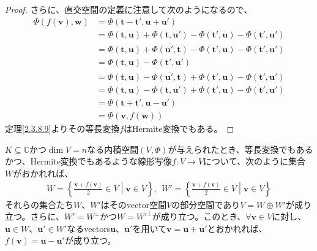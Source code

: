 \documentclass[dvipdfmx]{jsarticle}
\begin{document}
\begin{proof}
さらに、直交空間の定義に注意して次のようになるので、
\begin{align*}
\varPhi\left( f\left( \mathbf{v} \right),\mathbf{w} \right) &= \varPhi\left( \mathbf{t} - \mathbf{t}',\mathbf{u} + \mathbf{u}' \right)\\
&= \varPhi\left( \mathbf{t},\mathbf{u} \right) + \varPhi\left( \mathbf{t},\mathbf{u}' \right) - \varPhi\left( \mathbf{t}',\mathbf{u} \right) - \varPhi\left( \mathbf{t}',\mathbf{u}' \right)\\
&= \varPhi\left( \mathbf{t},\mathbf{u} \right) + \overline{\varPhi\left( \mathbf{u}',\mathbf{t} \right)} - \varPhi\left( \mathbf{t}',\mathbf{u} \right) - \varPhi\left( \mathbf{t}',\mathbf{u}' \right)\\
&= \varPhi\left( \mathbf{t},\mathbf{u} \right) - \varPhi\left( \mathbf{t}',\mathbf{u}' \right)\\
&= \varPhi\left( \mathbf{t},\mathbf{u} \right) - \overline{\varPhi\left( \mathbf{u}',\mathbf{t} \right)} + \varPhi\left( \mathbf{t}',\mathbf{u} \right) - \varPhi\left( \mathbf{t}',\mathbf{u}' \right)\\
&= \varPhi\left( \mathbf{t},\mathbf{u} \right) - \varPhi\left( \mathbf{t},\mathbf{u}' \right) + \varPhi\left( \mathbf{t}',\mathbf{u} \right) - \varPhi\left( \mathbf{t}',\mathbf{u}' \right)\\
&= \varPhi\left( \mathbf{t} + \mathbf{t}',\mathbf{u} - \mathbf{u}' \right)\\
&= \varPhi\left( \mathbf{v},f\left( \mathbf{w} \right) \right)
\end{align*}
定理\ref{2.3.8.9}よりその等長変換$f$はHermite変換でもある。
\end{proof}
\begin{thm}\label{2.3.8.12}
$K \subseteq \mathbb{C}$かつ$\dim V = n$なる内積空間$(V,\varPhi)$が与えられたとき、等長変換でもあるかつ、Hermite変換でもあるような線形写像$f:V \rightarrow V$について、次のように集合$W$がおかれれば、
\begin{align*}
W = \left\{ \frac{\mathbf{v} + f\left( \mathbf{v} \right)}{2} \in V \middle| \mathbf{v} \in V \right\},\ \ W' = \left\{ \frac{\mathbf{v} + f\left( \mathbf{v} \right)}{2} \in V \middle| \mathbf{v} \in V \right\}
\end{align*}
それらの集合たち$W$、$W'$はそのvector空間$V$の部分空間であり$V = W \oplus W'$が成り立つ。さらに、$W' = W^{\bot}$かつ$W = {W'}^{\bot}$が成り立つ。このとき、$\forall\mathbf{v} \in V$に対し、$\mathbf{u} \in W$、$\mathbf{u}' \in W'$なるvectors$\mathbf{u}$、$\mathbf{u}'$を用いて$\mathbf{v} = \mathbf{u} + \mathbf{u}'$とおかれれば、$f\left( \mathbf{v} \right) = \mathbf{u} - \mathbf{u}'$が成り立つ。
\end{thm}
\end{document}
